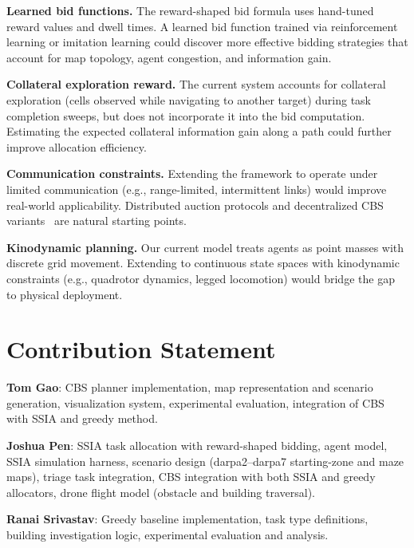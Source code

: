 \documentclass[conference]{IEEEtran}
\begin{document}
\textbf{Learned bid functions.} The reward-shaped bid formula uses hand-tuned reward values and dwell times. A learned bid function trained via reinforcement learning or imitation learning could discover more effective bidding strategies that account for map topology, agent congestion, and information gain.

\textbf{Collateral exploration reward.} The current system accounts for collateral exploration (cells observed while navigating to another target) during task completion sweeps, but does not incorporate it into the bid computation. Estimating the expected collateral information gain along a path could further improve allocation efficiency.

\textbf{Communication constraints.} Extending the framework to operate under limited communication (e.g., range-limited, intermittent links) would improve real-world applicability. Distributed auction protocols and decentralized CBS variants~\cite{sharon2012cbs} are natural starting points.

\textbf{Kinodynamic planning.} Our current model treats agents as point masses with discrete grid movement. Extending to continuous state spaces with kinodynamic constraints (e.g., quadrotor dynamics, legged locomotion) would bridge the gap to physical deployment.

\section*{Contribution Statement}

\textbf{Tom Gao}: CBS planner implementation, map representation and scenario generation, visualization system, experimental evaluation, integration of CBS with SSIA and greedy method.

\textbf{Joshua Pen}: SSIA task allocation with reward-shaped bidding, agent model, SSIA simulation harness, scenario design (darpa2--darpa7 starting-zone and maze maps), triage task integration, CBS integration with both SSIA and greedy allocators, drone flight model (obstacle and building traversal).

\textbf{Ranai Srivastav}: Greedy baseline implementation, task type definitions, building investigation logic, experimental evaluation and analysis.

\end{document}
